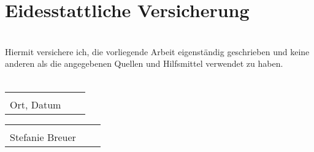 %
%
%
%
%
%
%
%
%

\setcounter{page}{22}
\lhead{}
\renewcommand{\headrulewidth}{0pt}


\section*{\Huge{Eidesstattliche Versicherung}}


\ \\[1.5cm]Hiermit versichere ich, die vorliegende Arbeit eigenständig geschrieben und keine anderen als die angegebenen Quellen und Hilfsmittel verwendet zu haben. 
\\
\\[2cm]


\vspace{0.5 cm} 
\begin{tabular}{p{5cm}p{.4cm}l}
\hline \\ 
Ort, Datum
\end{tabular}
\hfill 
\begin{tabular}{p{8cm}p{.4cm}l}
\hline \\ 
Stefanie Breuer 
\end{tabular}

\restoregeometry
